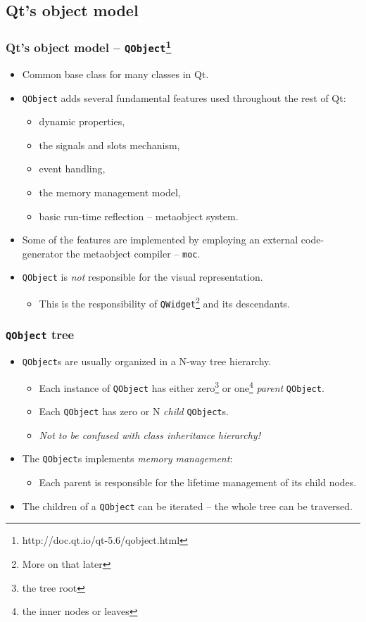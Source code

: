 \subsection{Qt's object model}

\begin{frame}
  \frametitle{Qt's object model -- \texttt{QObject}\footnote
    {http://doc.qt.io/qt-5.6/qobject.html}}
  \begin{itemize}
    \item Common base class for many classes in Qt.
    \item \texttt{QObject} adds several fundamental features used throughout
      the rest of Qt:
    \begin{itemize}
      \item dynamic properties,
      \item the signals and slots mechanism,
      \item event handling,
      \item the memory management model,
      \item basic run-time reflection -- metaobject system.
    \end{itemize}
    \item Some of the features are implemented by employing an external
      code-generator the metaobject compiler -- \texttt{moc}.
    \item \texttt{QObject} is {\em not} responsible for the visual representation.
    \begin{itemize}
      \item This is the responsibility of \texttt{QWidget}\footnote{More on that
      later} and its descendants.
    \end{itemize}
  \end{itemize}
\end{frame}

\begin{frame}
  \frametitle{\texttt{QObject} tree}
  \begin{itemize}
    \item \texttt{QObject}s are usually organized in a N-way tree hierarchy.
    \begin{itemize}
      \item Each instance of \texttt{QObject} has either zero\footnote{the tree root}
      or one\footnote{the inner nodes or leaves} {\em parent} \texttt{QObject}.
      \item Each \texttt{QObject} has zero or N {\em child} \texttt{QObject}s.
      \item {\em Not to be confused with class inheritance hierarchy!}
    \end{itemize}
    \item The \texttt{QObject}s implements {\em memory management}:
    \begin{itemize}
      \item Each parent is responsible for the lifetime management of its
      child nodes.
    \end{itemize}
    \item The children of a \texttt{QObject} can be iterated -- the whole tree
      can be traversed.
  \end{itemize}
\end{frame}

